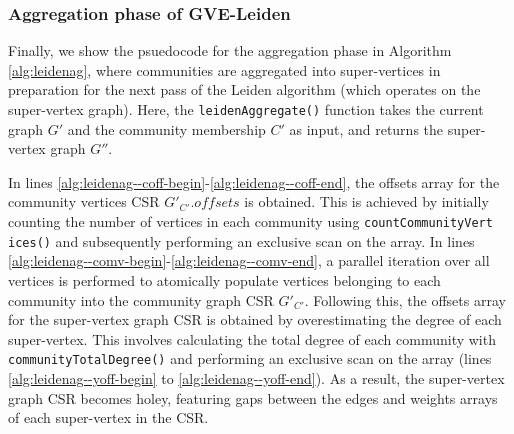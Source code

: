



\subsubsection{Aggregation phase of GVE-Leiden}

Finally, we show the psuedocode for the aggregation phase in Algorithm \ref{alg:leidenag}, where communities are aggregated into super-vertices in preparation for the next pass of the Leiden algorithm (which operates on the super-vertex graph). Here, the \texttt{leidenAggregate()} function takes the current graph $G'$ and the community membership $C'$ as input, and returns the super-vertex graph $G''$.

In lines \ref{alg:leidenag--coff-begin}-\ref{alg:leidenag--coff-end}, the offsets array for the community vertices CSR $G'_{C'}.offsets$ is obtained. This is achieved by initially counting the number of vertices in each community using \texttt{countCommunityVert} \texttt{ices()} and subsequently performing an exclusive scan on the array. In lines \ref{alg:leidenag--comv-begin}-\ref{alg:leidenag--comv-end},  a parallel iteration over all vertices is performed to atomically populate vertices belonging to each community into the community graph CSR $G'_{C'}$. Following this, the offsets array for the super-vertex graph CSR is obtained by overestimating the degree of each super-vertex. This involves calculating the total degree of each community with \texttt{communityTotalDegree()} and performing an exclusive scan on the array (lines \ref{alg:leidenag--yoff-begin} to \ref{alg:leidenag--yoff-end}). As a result, the super-vertex graph CSR becomes holey, featuring gaps between the edges and weights arrays of each super-vertex in the CSR.

